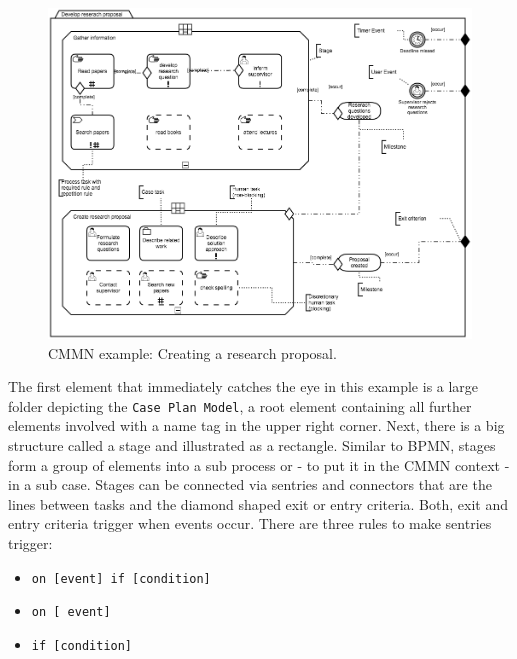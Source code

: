 \begin{figure}

	\label{fig:CMMNex}
	\centering
	\includegraphics[scale=0.5]{../figures/chapter_indicators/CMMN_Example_Proposal_Creation.png} 
		\caption{CMMN example: Creating a research proposal.}
\end{figure}

The first element that immediately catches the eye in this example is a large folder depicting the \texttt{Case Plan Model}, a root element containing all further elements involved with a name tag in the upper right corner. Next, there is a big structure called a stage and illustrated as a rectangle. Similar to BPMN, stages form a group of elements into a sub process or - to put it in the CMMN context - in a sub case. Stages can be connected via sentries and connectors that are the lines between tasks and the diamond shaped exit or entry criteria. Both, exit and entry criteria trigger when events occur. There are three rules to make sentries trigger:

\begin{itemize}
\item \texttt{on [event] if [condition]} 
\item \texttt{on [ event]}
\item\texttt{if  [condition]}
\end{itemize}

